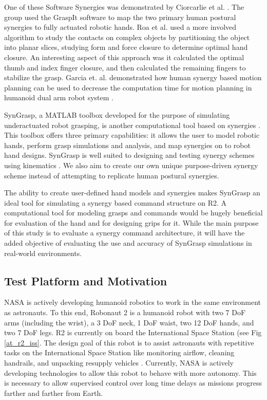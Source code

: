 \documentclass[runningheads,a4paper]{llncs}
\begin{document}
 One of these Software Synergies was demonstrated by Ciorcarlie et al. \cite{ciocarlie_2007_dexterous}.  The group used the GraspIt software to map the two primary human postural synergies to fully actuated robotic hands.  Roa et al. \cite{power_grasp} used a more involved algorithm to study the contacts on complex objects by partitioning the object into planar slices, studying form and force closure  \cite{bicchi} to determine optimal hand closure. An interesting aspect of this approach was it calculated the optimal thumb and index finger closure, and then calculated the remaining fingers to stabilize the grasp.   Garcia et. al. demonstrated how human synergy based motion planning can be used to decrease the computation time for motion planning in humanoid dual arm robot system  \cite{garcia}.

SynGrasp, a MATLAB toolbox developed for the purpose of simulating underactuated robot grasping, is another computational tool based on synergies \cite{syngrasp}.  This toolbox offers three primary capabilities: it allows the user to model robotic hands, perform grasp simulations and analysis, and map synergies on to robot hand designs. SynGrasp is well suited to designing and testing  synergy schemes using kinematics \cite{salvietti_2016_map}.  We also aim to create our own unique purpose-driven synergy scheme instead of attempting to replicate human postural synergies.

The ability to create user-defined hand models and synergies makes SynGrasp an ideal tool for simulating a synergy based command structure on R2.  A computational tool for modeling grasps and commands would be hugely beneficial for evaluation of the hand and for designing grips for it. %
While the main purpose of this study is to evaluate a synergy command architecture, it will have the added objective of evaluating the use and accuracy of SynGrasp simulations in real-world environments.

\subsection{Test Platform and Motivation}

NASA is actively developing humanoid robotics to work in the same environment as astronauts. To this end, Robonaut 2 is a humanoid robot with two 7 DoF arms (including the wrist), a 3 DoF neck, 1 DoF waist, two 12 DoF hands, and two 7 DoF legs. R2 is currently on board the International Space Station (see Fig \ref{at_r2_iss}. The design goal of this robot is to assist astronauts with repetitive tasks on the International Space Station like monitoring airflow, cleaning handrails, and unpacking resupply vehicles \cite{r2_diftler}. Currently, NASA is actively developing technologies to allow this robot to behave with more autonomy. This is necessary to allow supervised control over long time delays as missions progress farther and farther from Earth. 
\end{document}
